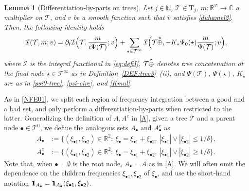 \documentclass[a4paper,
11pt,  reqno]{amsart}
\makeatletter
\newcommand{\mathbbm}[1]{\mathchoice%
    {\hbox{\sffamily 1\kern-.40em 1}}%
    {\hbox{\sffamily 1\kern-.40em 1}}%
    {\hbox{\scriptsize\sffamily 1\kern-.30em 1}}%
    {\hbox{\tiny\sffamily 1\kern-.25em 1}}}%
\newcommand{\5}{\textup{V}}
\newcommand{\noi}{\noindent}
\newcommand{\ft}{\widehat}
\newcommand{\ind}{\mathbbm 1}
\newcommand{\les}{\lesssim}
\newcommand{\dt}{\partial_t}
\newtheorem{lemma}[theorem]{Lemma}
\theoremstyle{remark}
\newcommand{\R}{\mathbb{R}}
\newcommand{\bul}{\bullet}
\newcommand{\TT}{\mathcal{T}}
\newcommand{\Tr}{\mathrm{T}}
\newcommand{\N}{\mathbb{N}}
\def\<#1>{\csname MH@symb@#1\endcsname}
\newcommand{\Ical}{\mathcal{I}}
\numberwithin{equation}{section}
\numberwithin{theorem}{section}
\makeatother
\begin{document}
\begin{lemma}[Differentiation-by-parts on trees]
\label{LEM:IBP}
Let $j\in\N$, $\TT\in\Tr_j$, $m: \R^{\TT}\to \mathbb{C}$ a multiplier on $\TT$,
and $v$ be a smooth function such that $\ft v$ satisfies \eqref{duhamel2}. Then, the following identity holds
\begin{align}\label{IBP}
\begin{split}
\Ical (\TT,m; v)
= \dt \Ical \Big(\TT,\frac{m}{ i \Psi(\TT)} ; v \Big)
+ \sum_{\star \in \TT^\infty} \Ical 
\Big(\TT \overset{\star}{\oplus} \<1>
, - K_\star \Psi_0(\star) \frac{m}{\Psi(\TT)} ; v \Big)
,
\end{split}
\end{align}
where $\Ical$ is the integral functional in \eqref{eq:defiI}, $\TT \overset{\star}{\oplus} \<1>$ denotes tree concatenation at the final node $\star\in \TT^\infty$ as in Definition~\ref{DEF:tree3}~(ii), and $\Psi(\TT)$, $\Psi(\star)$, $K_\star$ are as in \eqref{psi0-tree}, \eqref{psi-circ}, and \eqref{Kmul}.

\end{lemma}



\noi
As in \eqref{NFE01}, we split each region of frequency integration between a good and a bad set, and only perform a differentiation-by-parts when restricted to the latter. Generalizing the definition of $A, A^c$ in \eqref{A}, given a tree $\TT$ and a parent node $\bul \in \TT^0$, we define the analogous sets $A_\bul$ and $A_\bul^c$ as
\begin{align}
A_\bul& 
:=
 \big\{ (\xi_{\bul1}, \xi_{\bul2}) \in \R^2: \ \xi_\bul =
\xi_{\bul1}
+ \xi_{\bul2}, \ |\xi_{\bul1}| \lor  |\xi_{\bul2}|  \le 1/\delta 
 \} , \\
A_\bul^c & := \big\{ (\xi_{\bul1}, \xi_{\bul2}) \in \R^2: \ \xi_\bul =
\xi_{\bul1} +
\xi_{\bul2},\
|\xi_{\bul1}| \lor |\xi_{\bul2}| \ge 1/\delta \big\} 
.
\label{defA}
\end{align}
Note that, when $\bul = \emptyset$ is the root node, $A_\bul =A$ as in \eqref{A}. 
We will often omit the dependence on the children frequencies $\xi_{\bul 1}, \xi_{\bul2}$ of $\xi_\bul$, and use the short-hand notation $\ind_{A_\bul}=\ind_{A_\bul} (\xi_{\bul1},\xi_{\bul2})$.
\end{document}
